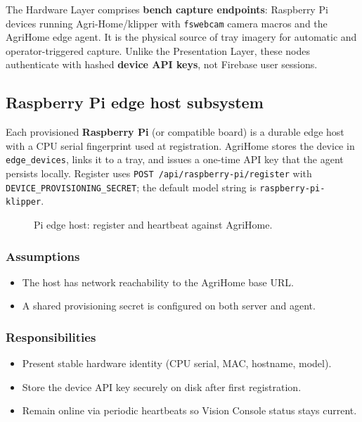 The Hardware Layer comprises \textbf{bench capture endpoints}: Raspberry Pi devices running
Agri-Home/klipper with \texttt{fswebcam} camera macros and the AgriHome edge agent. It is the
physical source of tray imagery for automatic and operator-triggered capture. Unlike the
Presentation Layer, these nodes authenticate with hashed \textbf{device API keys}, not Firebase
user sessions.

\subsection{Raspberry Pi edge host subsystem}

Each provisioned \textbf{Raspberry Pi} (or compatible board) is a durable edge host with a CPU serial fingerprint used at registration. AgriHome stores the device in \texttt{edge\_devices}, links it to a tray, and issues a one-time API key that the agent persists locally. Register uses \texttt{POST /api/raspberry-pi/register} with \texttt{DEVICE\_PROVISIONING\_SECRET}; the default model string is \texttt{raspberry-pi-klipper}.

\begin{figure}[H]
\centering
{}
\caption{Pi edge host: register and heartbeat against AgriHome.}
\label{fig:hw-pi}
\end{figure}

\subsubsection{Assumptions}
\begin{itemize}
  \item The host has network reachability to the AgriHome base URL.
  \item A shared provisioning secret is configured on both server and agent.
\end{itemize}

\subsubsection{Responsibilities}
\begin{itemize}
  \item Present stable hardware identity (CPU serial, MAC, hostname, model).
  \item Store the device API key securely on disk after first registration.
  \item Remain online via periodic heartbeats so Vision Console status stays current.
\end{itemize}

